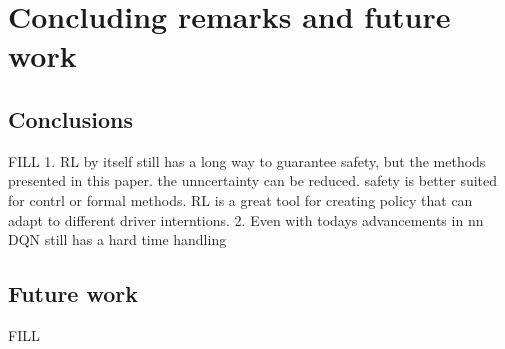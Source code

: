 \chapter{Concluding remarks and future work}
\section{Conclusions}\label{sec:conclusion}
FILL
1. RL by itself still has a long way to guarantee safety, but the methods presented in this paper. the unncertainty can be reduced. safety is better suited for contrl or formal methods. RL is a great tool for creating policy that can adapt to different driver interntions. 
2. Even with todays advancements in \gls{nn} DQN still has a hard time handling 
\section{Future work}
FILL